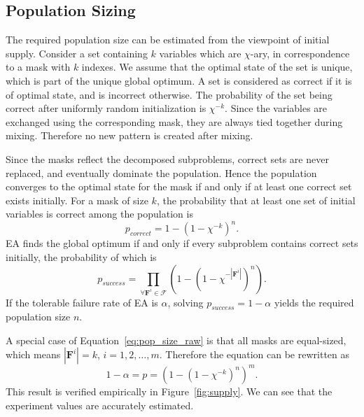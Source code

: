 \documentclass{sig-alternate}
\begin{document}
\subsection{Population Sizing}

The required population size can be estimated from the viewpoint of initial supply.
Consider a set containing $k$ variables which are $\chi$-ary,
in correspondence to a mask with $k$ indexes.
We assume that the optimal state of the set is unique, which is part of the unique global optimum.
A set is considered as correct if it is of optimal state, and is incorrect otherwise.
The probability of the set being correct after
uniformly random initialization is $\chi^{-k}$.
Since the variables are exchanged using the corresponding mask,
they are always tied together during mixing.
Therefore no new pattern is created after mixing.

Since the masks reflect the decomposed subproblems,
correct sets are never replaced,
and eventually dominate the population.
Hence the population converges to the optimal state for the mask
if and only if at least one correct set exists initially.
For a mask of size $k$,
the probability that at least one set of initial variables is correct among the population is
\begin{equation*}
p_{correct} = 1-\left(1-\chi^{-k}\right)^n.
\end{equation*}
EA finds the global optimum if and only if every subproblem contains correct sets initially,
the probability of which is
\begin{equation}\label{eq:pop_size_raw}
p_{success}=\prod\limits_{\forall {\mathbf{F}}^i \in {\mathcal{F}}} \left(1-\left(1-\chi^{-|{\mathbf{F}}^i|}\right)^n\right).
\end{equation}
If the tolerable failure rate of EA is $\alpha$,
solving $p_{success}=1-\alpha$ yields the required population size $n$.

A special case of Equation~\ref{eq:pop_size_raw} is that all masks are equal-sized,
which means $|{\mathbf{F}}^i| = k$, $i={1,2, \dots, m}$.
Therefore the equation can be rewritten as
\begin{equation}\label{eq:suc_rate}
1-\alpha=p=\left(1-\left(1-\chi^{-k}\right)^n\right)^m.
\end{equation}
This result is verified empirically in Figure~\ref{fig:supply}.
We can see that the experiment values are accurately estimated.
\end{document}

